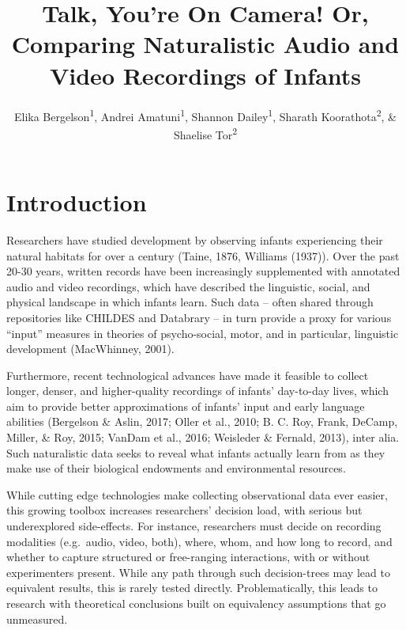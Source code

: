 \documentclass[floatsintext,man]{apa6}
\title{Talk, You're On Camera! Or, Comparing Naturalistic Audio and Video
Recordings of Infants}
\author{Elika Bergelson\textsuperscript{1}, Andrei Amatuni\textsuperscript{1}, Shannon Dailey\textsuperscript{1}, Sharath Koorathota\textsuperscript{2}, \& Shaelise Tor\textsuperscript{2}}
\affiliation{
    \vspace{0.5cm}
          \textsuperscript{1} Duke University\\
          \textsuperscript{2} University of Rochester  }
\theoremstyle{definition}
\theoremstyle{definition}
\theoremstyle{definition}
\theoremstyle{remark}
\begin{document}
\maketitle

\setcounter{secnumdepth}{0}



\hypertarget{introduction}{%
\section{Introduction}\label{introduction}}

Researchers have studied development by observing infants experiencing
their natural habitats for over a century (Taine, 1876, Williams
(1937)). Over the past 20-30 years, written records have been
increasingly supplemented with annotated audio and video recordings,
which have described the linguistic, social, and physical landscape in
which infants learn. Such data -- often shared through repositories like
CHILDES and Databrary -- in turn provide a proxy for various
\enquote{input} measures in theories of psycho-social, motor, and in
particular, linguistic development (MacWhinney, 2001).

Furthermore, recent technological advances have made it feasible to
collect longer, denser, and higher-quality recordings of infants'
day-to-day lives, which aim to provide better approximations of infants'
input and early language abilities (Bergelson \& Aslin, 2017; Oller et
al., 2010; B. C. Roy, Frank, DeCamp, Miller, \& Roy, 2015; VanDam et
al., 2016; Weisleder \& Fernald, 2013), inter alia. Such naturalistic
data seeks to reveal what infants actually learn from as they make use
of their biological endowments and environmental resources.

While cutting edge technologies make collecting observational data ever
easier, this growing toolbox increases researchers' decision load, with
serious but underexplored side-effects. For instance, researchers must
decide on recording modalities (e.g.~audio, video, both), where, whom,
and how long to record, and whether to capture structured or
free-ranging interactions, with or without experimenters present. While
any path through such decision-trees may lead to equivalent results,
this is rarely tested directly. Problematically, this leads to research
with theoretical conclusions built on equivalency assumptions that go
unmeasured.
\end{document}

